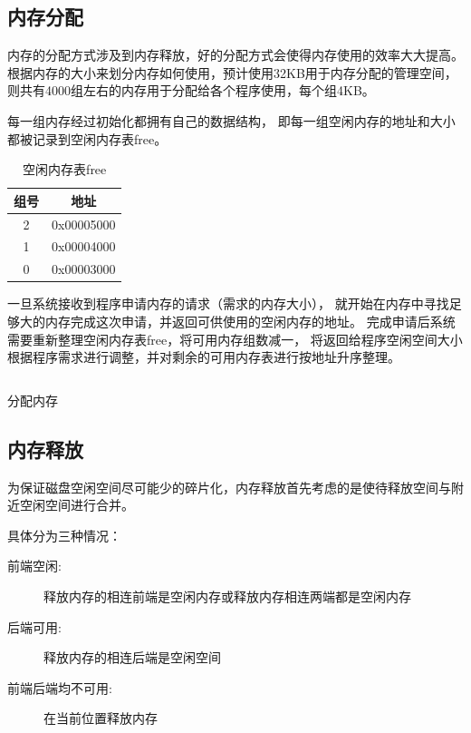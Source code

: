 \subsection{内存分配}

内存的分配方式涉及到内存释放，好的分配方式会使得内存使用的效率大大提高。
根据内存的大小来划分内存如何使用，预计使用32KB用于内存分配的管理空间，
则共有4000组左右的内存用于分配给各个程序使用，每个组4KB。

每一组内存经过初始化都拥有自己的数据结构，
即每一组空闲内存的地址和大小都被记录到空闲内存表free。

\begin{table}[!ht]
  \centering
  \begin{tabular}{|c|c|}
    \hline 组号 & 地址 \\
    \hline 2 & 0x00005000 \\ 
    \hline 1 & 0x00004000 \\
    \hline 0 & 0x00003000 \\
    \hline
  \end{tabular}
  \caption{空闲内存表free}
  \label{tab:free}
\end{table}

一旦系统接收到程序申请内存的请求（需求的内存大小），
就开始在内存中寻找足够大的内存完成这次申请，并返回可供使用的空闲内存的地址。
完成申请后系统需要重新整理空闲内存表free，将可用内存组数减一，
将返回给程序空闲空间大小根据程序需求进行调整，并对剩余的可用内存表进行按地址升序整理。

\begin{listing}[H]
  \inputminted[tabsize=2, firstline=68, lastline=78,
  linenos=true]{c}{../ZOS/src/kernel/memory.c}
  \caption{分配内存}
  \label{.lstc:alloc}
\end{listing}


\subsection{内存释放}

为保证磁盘空闲空间尽可能少的碎片化，内存释放首先考虑的是使待释放空间与附近空闲空间进行合并。

具体分为三种情况：

\begin{description}
\item[前端空闲:]释放内存的相连前端是空闲内存或释放内存相连两端都是空闲内存
\item[后端可用:]释放内存的相连后端是空闲空间
\item[前端后端均不可用:]在当前位置释放内存
\end{description}


